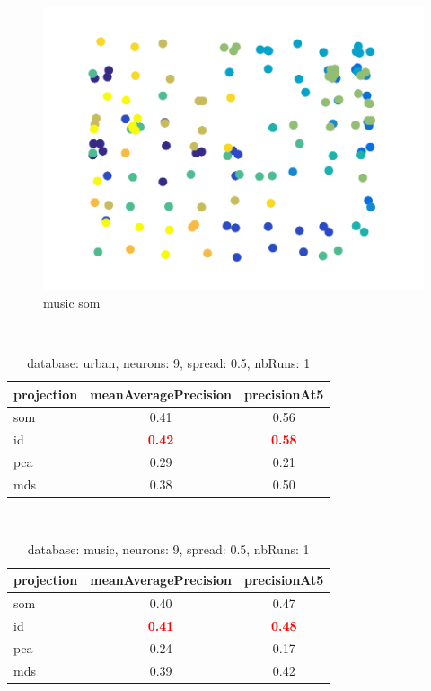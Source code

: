 \documentclass[12pt,a4paper,fleqn]{tufte-handout}
\begin{document}
\begin{figure}   
\begin{center}   
\includegraphics[scale=.5]{figures/music_som}   
\caption{music som}   
\end{center}   
\end{figure}   
 
 
 
 
 
 
\begin{table}  
\begin{center}  
\  
\setlength{\tabcolsep}{.16667em}  
\begin{tabular}{lcc}  
projection & meanAveragePrecision & precisionAt5 \\  
\hline  
som & 0.41 & 0.56 \\  
id & \textbf{\textcolor{red}{0.42}} & \textbf{\textcolor{red}{0.58}} \\  
pca & 0.29 & 0.21 \\  
mds & 0.38 & 0.50 \\  
\end{tabular}  
\end{center}  
\caption{database: urban, neurons: 9, spread: 0.5, nbRuns: 1}  
\label{daurNe9Sp0.5Nbru1}  
\end{table}  
 
  
\begin{table} 
\begin{center} 
\ 
 \setlength{\tabcolsep}{.16667em} 
\begin{tabular}{lcc} 
projection & meanAveragePrecision & precisionAt5 \\ 
\hline 
som & 0.40 & 0.47 \\ 
id & \textbf{\textcolor{red}{0.41}} & \textbf{\textcolor{red}{0.48}} \\ 
pca & 0.24 & 0.17 \\ 
mds & 0.39 & 0.42 \\ 
\end{tabular} 
\end{center} 
\caption{database: music, neurons: 9, spread: 0.5, nbRuns: 1} 
\label{damuNe9Sp0.5Nbru1} 
\end{table} 
 
 
 
    
    
 
\end{document}

